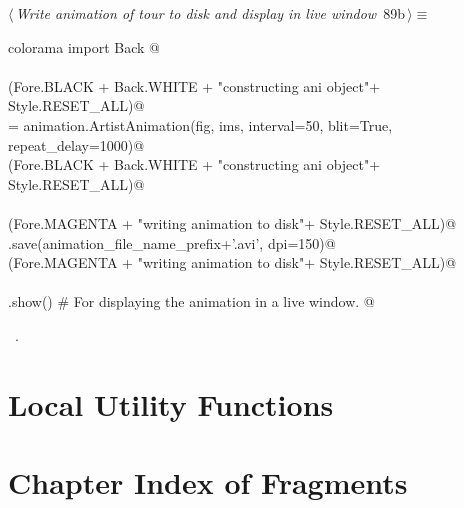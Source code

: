 \documentclass[11.5pt]{report}
\begin{document}
\vspace{-0.8cm} \newchunk
\begin{flushleft} \small\label{scrap141}\raggedright\small
{} $\langle\,${\itshape Write animation of tour to disk and display in live window}\nobreak\ {\footnotesize {89b}}$\,\rangle\equiv$
\vspace{-1ex}
\begin{list}{}{} \item
\mbox{}\verb@from colorama import Back @\\
\mbox{}\verb@@\\
\mbox{}\verb@debug(Fore.BLACK + Back.WHITE + "\nStarted constructing ani object"+ Style.RESET_ALL)@\\
\mbox{}\verb@ani = animation.ArtistAnimation(fig, ims, interval=50, blit=True, repeat_delay=1000)@\\
\mbox{}\verb@debug(Fore.BLACK + Back.WHITE + "\nFinished constructing ani object"+ Style.RESET_ALL)@\\
\mbox{}\verb@@\\
\mbox{}\verb@debug(Fore.MAGENTA + "\nStarted writing animation to disk"+ Style.RESET_ALL)@\\
\mbox{}\verb@ani.save(animation_file_name_prefix+'.avi', dpi=150)@\\
\mbox{}\verb@debug(Fore.MAGENTA + "\nFinished writing animation to disk"+ Style.RESET_ALL)@\\
\mbox{}\verb@@\\
\mbox{}\verb@plt.show() # For displaying the animation in a live window. @\\
\mbox{}\verb@@{\NWsep}
\end{list}
\vspace{-1.5ex}
\footnotesize
\begin{list}{}{\setlength{\itemsep}{-\parsep}\setlength{\itemindent}{-\leftmargin}}
\item \NWtxtMacroRefIn\ .

\item{}
\end{list}
\vspace{4ex}
\end{flushleft}




\needspace{17cm}
\section{Local Utility Functions}
\blindtext
\section{Chapter Index of Fragments}
\end{document}
